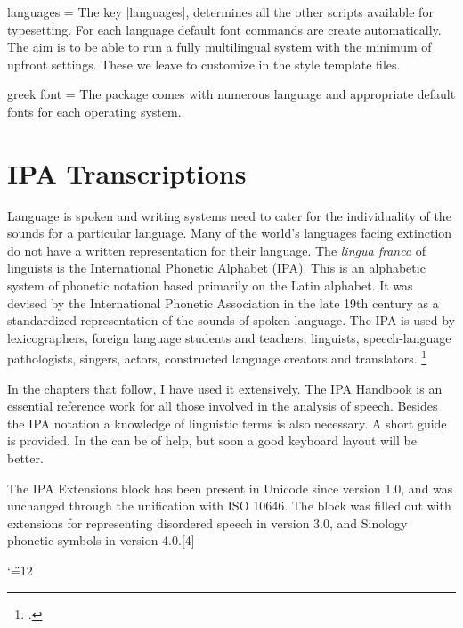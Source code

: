 \begin{docKey}{languages}{ = }  {}
The key |languages|, determines all the other scripts available for typesetting. For each language default font commands are create automatically. The aim is to be able to run a fully multilingual system with the minimum of upfront settings. These we leave to customize in the style template files.
\end{docKey}

\begin{docKey}{greek font}{ = }  {}
The package comes with numerous language and appropriate default fonts
for each operating system. 
\end{docKey}



\section{IPA Transcriptions}

Language is spoken and writing systems need to cater for the individuality of the sounds for a particular language. Many of the world's languages facing extinction do not have a written representation for their language. The \textit{lingua franca} of linguists is the  International Phonetic Alphabet (IPA). This is an alphabetic system of phonetic notation based primarily on the Latin alphabet. It was devised by the International Phonetic Association in the late 19th century as a standardized representation of the sounds of spoken language. The IPA is used by lexicographers, foreign language students and teachers, linguists, speech-language pathologists, singers, actors, constructed language creators and translators. \footcite{ipa}

In the chapters that follow, I have used it extensively. The IPA Handbook is an essential reference work for all those involved in the analysis of speech. Besides the IPA notation a knowledge of linguistic terms is also necessary. A short guide is provided. In \latex the  can be of help, but soon a good keyboard layout will be better.

The IPA Extensions block has been present in Unicode since version 1.0, and was unchanged through the unification with ISO 10646. The block was filled out with extensions for representing disordered speech in version 3.0, and Sinology phonetic symbols in version 4.0.[4]

\bigskip
{\catcode`\"=12
}
\bigskip

